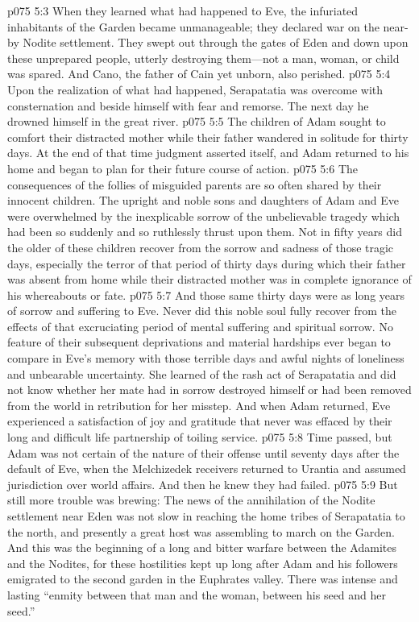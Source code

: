 \vs p075 5:3 When they learned what had happened to Eve, the infuriated inhabitants of the Garden became unmanageable; they declared war on the near\hyp{}by Nodite settlement. They swept out through the gates of Eden and down upon these unprepared people, utterly destroying them---not a man, woman, or child was spared. And Cano, the father of Cain yet unborn, also perished.
\vs p075 5:4 Upon the realization of what had happened, Serapatatia was overcome with consternation and beside himself with fear and remorse. The next day he drowned himself in the great river.
\vs p075 5:5 The children of Adam sought to comfort their distracted mother while their father wandered in solitude for thirty days. At the end of that time judgment asserted itself, and Adam returned to his home and began to plan for their future course of action.
\vs p075 5:6 The consequences of the follies of misguided parents are so often shared by their innocent children. The upright and noble sons and daughters of Adam and Eve were overwhelmed by the inexplicable sorrow of the unbelievable tragedy which had been so suddenly and so ruthlessly thrust upon them. Not in fifty years did the older of these children recover from the sorrow and sadness of those tragic days, especially the terror of that period of thirty days during which their father was absent from home while their distracted mother was in complete ignorance of his whereabouts or fate.
\vs p075 5:7 And those same thirty days were as long years of sorrow and suffering to Eve. Never did this noble soul fully recover from the effects of that excruciating period of mental suffering and spiritual sorrow. No feature of their subsequent deprivations and material hardships ever began to compare in Eve’s memory with those terrible days and awful nights of loneliness and unbearable uncertainty. She learned of the rash act of Serapatatia and did not know whether her mate had in sorrow destroyed himself or had been removed from the world in retribution for her misstep. And when Adam returned, Eve experienced a satisfaction of joy and gratitude that never was effaced by their long and difficult life partnership of toiling service.
\pc \vs p075 5:8 Time passed, but Adam was not certain of the nature of their offense until seventy days after the default of Eve, when the Melchizedek receivers returned to Urantia and assumed jurisdiction over world affairs. And then he knew they had failed.\plusone
\pc \vs p075 5:9 But still more trouble was brewing: The news of the annihilation of the Nodite settlement near Eden was not slow in reaching the home tribes of Serapatatia to the north, and presently a great host was assembling to march on the Garden. And this was the beginning of a long and bitter warfare between the Adamites and the Nodites, for these hostilities kept up long after Adam and his followers emigrated to the second garden in the Euphrates valley. There was intense and lasting “enmity between that man and the woman, between his seed and her seed.”
